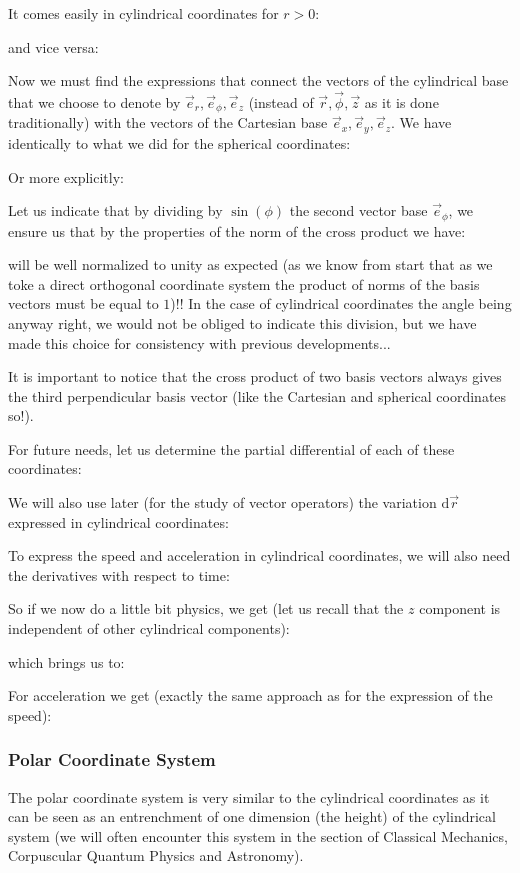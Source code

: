	It comes easily in cylindrical coordinates for $r>0$:
	
	and vice versa:
	 
	Now we must find the expressions that connect the vectors of the cylindrical base that we choose to denote by $\vec{e}_r,\vec{e}_\phi,\vec{e}_z$ (instead of $\vec{r}, \vec{\phi},\vec{z}$ as it is done traditionally) with the vectors of the Cartesian base $\vec{e}_x,\vec{e}_y,\vec{e}_z$. We have identically to what we did for the spherical coordinates:
	
	Or more explicitly:
	
	Let us indicate that by dividing by $\sin(\phi)$ the second vector base $\vec{e}_\phi$, we ensure us that by the properties of the norm of the cross product we have:
	
	will be well normalized to unity as expected (as we know from start that as we toke a direct orthogonal coordinate system the product of norms of the basis vectors must be equal to $1$)!! In the case of cylindrical coordinates the angle being anyway right, we would not be obliged to indicate this division, but we have made this choice for consistency with previous developments...
	
	\begin{tcolorbox}[title=Remark,colframe=black,arc=10pt]
	It is important to notice that the cross product of two basis vectors always gives the third perpendicular  basis vector (like the Cartesian and spherical coordinates so!).
	\end{tcolorbox}
	For future needs, let us determine the partial differential of each of these coordinates:
	
	We will also use later (for the study of vector operators) the variation $\mathrm{d}\vec{r}$ expressed in cylindrical coordinates:
	
	To express the speed and acceleration in cylindrical coordinates, we will also need the derivatives with respect to time:
	
	So if we now do a little bit physics, we get (let us recall that the $z$ component is independent of other cylindrical components):
	
	which brings us to:
	
	For acceleration we get (exactly the same approach as for the expression of the speed):
	
	
	\subsubsection{Polar Coordinate System}\label{polar coordinates}
	The polar coordinate system is very similar to the cylindrical coordinates as it can be seen as an entrenchment of one dimension (the height) of the cylindrical system (we will often encounter this system in the section of Classical Mechanics, Corpuscular Quantum Physics and Astronomy).

